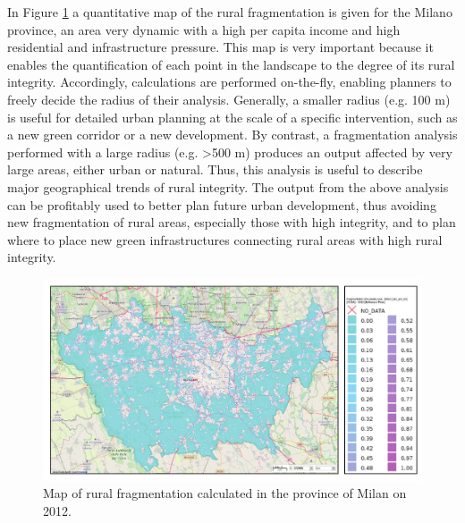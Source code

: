 \documentclass[APA,LATO1COL,doublespace]{WileyNJD-v2}
\begin{document}
In Figure \ref{fig:casePROV} a quantitative map of the rural fragmentation is given for the Milano province, an area very dynamic with a high per capita income and high residential and infrastructure pressure. 
This map is very important because it enables the quantification of each point in the landscape to the degree of its rural integrity. 
Accordingly, calculations are performed on-the-fly, enabling planners to freely decide the radius of their analysis.
Generally, a smaller radius (e.g. 100 m) is useful for detailed urban planning at the scale of a specific intervention, such as a new green corridor or a new development.
By contrast, a fragmentation analysis performed with a large radius (e.g. >500 m) produces an output affected by very large areas, either urban or natural. 
Thus, this analysis is useful to describe major geographical trends of rural integrity.
The output from the above analysis can be profitably used to better plan future urban development, thus avoiding new fragmentation of rural areas, especially those with high integrity, and to plan where to place new green infrastructures connecting rural areas with high rural integrity.

\begin{figure}[t] %
    \centerline{\includegraphics[width=450pt]{06_caso_provinciale.pdf}}
    \caption{ Map of rural fragmentation calculated in the province of Milan on 2012. } \label{fig:casePROV}
\end{figure}
\end{document}
